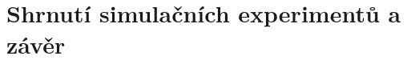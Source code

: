 \documentclass[11pt]{article}
\begin{document}
	
	\section{Shrnutí simulačních experimentů a závěr}
	
	
	\newpage
	
	
	
\end{document}

